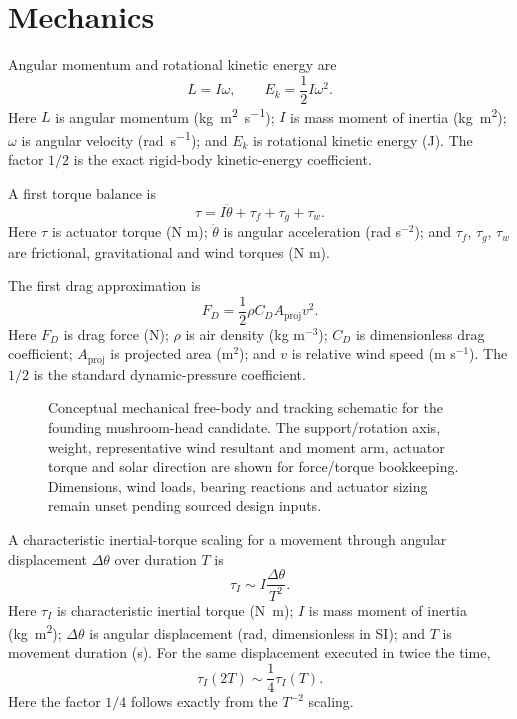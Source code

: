\documentclass[11pt,a4paper]{article}
\begin{document}
\section{Mechanics}
Angular momentum and rotational kinetic energy are
\begin{equation}
L=I\omega,\qquad E_k=\frac12I\omega^2.
\end{equation}
Here $L$ is angular momentum (\si{\kilogram\metre\squared\per\second}); $I$ is mass moment of inertia (\si{\kilogram\metre\squared}); $\omega$ is angular velocity (\si{\radian\per\second}); and $E_k$ is rotational kinetic energy (J). The factor $1/2$ is the exact rigid-body kinetic-energy coefficient.

A first torque balance is
\begin{equation}
\tau=I\ddot\theta+\tau_f+\tau_g+\tau_w.
\end{equation}
Here $\tau$ is actuator torque (N m); $\ddot\theta$ is angular acceleration (rad s$^{-2}$); and $\tau_f$, $\tau_g$, $\tau_w$ are frictional, gravitational and wind torques (N m).

The first drag approximation is
\begin{equation}
F_D=\frac12\rho C_DA_{\mathrm{proj}}v^2.
\end{equation}
Here $F_D$ is drag force (N); $\rho$ is air density (kg m$^{-3}$); $C_D$ is dimensionless drag coefficient; $A_{\mathrm{proj}}$ is projected area (m$^2$); and $v$ is relative wind speed (m s$^{-1}$). The $1/2$ is the standard dynamic-pressure coefficient.

\begin{figure}[htbp]
\centering

\caption{Conceptual mechanical free-body and tracking schematic for the founding mushroom-head candidate. The support/rotation axis, weight, representative wind resultant and moment arm, actuator torque and solar direction are shown for force/torque bookkeeping. Dimensions, wind loads, bearing reactions and actuator sizing remain unset pending sourced design inputs.}
\label{fig:mechanical-fbd}
\end{figure}


A characteristic inertial-torque scaling for a movement through angular displacement \(\Delta\theta\) over duration \(T\) is
\begin{equation}
\tau_I\sim I\frac{\Delta\theta}{T^2}.
\end{equation}
Here \(\tau_I\) is characteristic inertial torque (\si{\newton\metre}); \(I\) is mass moment of inertia (\si{\kilogram\metre\squared}); \(\Delta\theta\) is angular displacement (rad, dimensionless in SI); and \(T\) is movement duration (\si{\second}). For the same displacement executed in twice the time,
\begin{equation}
\tau_I(2T)\sim\frac{1}{4}\tau_I(T).
\end{equation}
Here the factor \(1/4\) follows exactly from the \(T^{-2}\) scaling.
\end{document}
